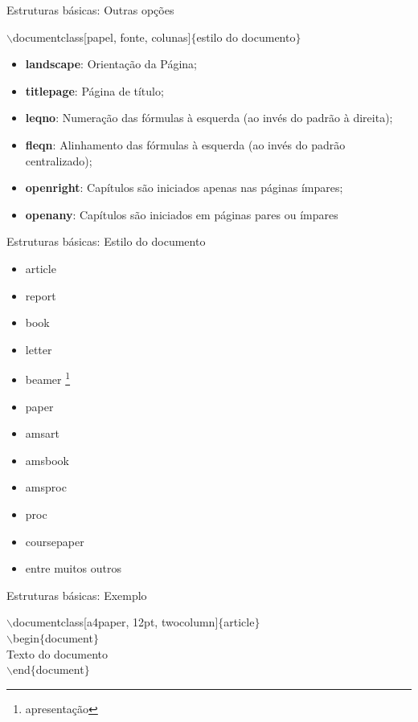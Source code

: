 \begin{frame}{Estruturas básicas: Outras opções}
    \begin{block}{}
        $\backslash$documentclass[papel, fonte, colunas]$\{$estilo do documento$\}$
    \end{block}
    \begin{itemize}
        \item \textbf{landscape}: Orientação da Página;
        \item \textbf{titlepage}: Página de título;
        \item \textbf{leqno}: Numeração das fórmulas à esquerda (ao invés do padrão à direita);
        \item \textbf{fleqn}: Alinhamento das fórmulas à esquerda (ao invés do padrão centralizado);
        \item \textbf{openright}: Capítulos são iniciados apenas nas páginas ímpares;
        \item \textbf{openany}: Capítulos são iniciados em páginas pares ou ímpares
        
    \end{itemize}
\end{frame}


\begin{frame}{Estruturas básicas: Estilo do documento}
    \begin{itemize}
        \item article
        \item report
        \item book
        \item letter
        \item beamer \footnote{apresentação}
        \item paper
        \item amsart
        \item amsbook
        \item amsproc
        \item proc
        \item coursepaper 
        \item entre muitos outros
    \end{itemize}
\end{frame}


\begin{frame}{Estruturas básicas: Exemplo}
    \begin{block}{}
        $\backslash$documentclass[a4paper, 12pt, twocolumn]$\{$article$\}$\\
            $\backslash$begin$\{$document$\}$\\
                Texto do documento\\
            $\backslash$end$\{$document$\}$
    \end{block}
\end{frame}

